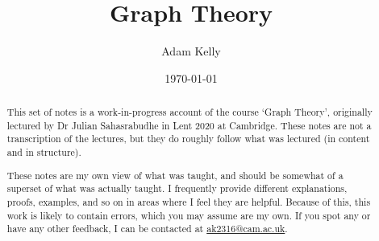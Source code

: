 \documentclass[a4paper]{scrreprt}
\title{Graph Theory}
\author{Adam Kelly}
\date{\today}
\begin{document}
\maketitle

\begin{abstract}
	

	This set of notes is a work-in-progress account of the course `Graph Theory', originally lectured by Dr Julian Sahasrabudhe in Lent 2020 at Cambridge. These notes are not a transcription of the lectures, but they do roughly follow what was lectured (in content and in structure).

	These notes are my own view of what was taught, and should be somewhat of a superset of what was actually taught. I frequently provide different explanations, proofs, examples, and so on in areas where I feel they are helpful. Because of this, this work is likely to contain errors, which you may assume are my own. If you spot any or have any other feedback, I can be contacted at \href{mailto:ak2316@cam.ac.uk}{ak2316@cam.ac.uk}.



\end{abstract}

\tableofcontents



\end{document}
